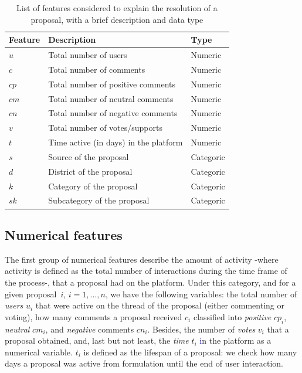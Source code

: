\begin{table}[H]
\caption{List of features considered to explain the resolution of a proposal, with a brief description and data type}
\label{list}
\centering
\begin{tabular}{lll}  
\\
\toprule
 \textbf{Feature} & \textbf{Description} & \textbf{Type}   \\
\midrule
$u$  	& Total number of users  & Numeric \\
$c$  	& Total number of comments &	Numeric	\\
$cp$ 	& Total number of positive comments & Numeric \\
$cm$ 	& Total number of neutral comments & Numeric \\
$cn$ 	& Total number of negative comments & Numeric \\
$v$  	& Total number of votes/supports & Numeric \\
$t$  	& Time active (in days) in the platform & Numeric \\
\midrule
$s$ 	& Source of the proposal & Categoric \\
$d$ 	& District of the proposal & Categoric \\
$k$	& Category of the proposal & Categoric \\
$sk$	& Subcategory of the proposal & Categoric \\
\bottomrule
\end{tabular}
\end{table}
\subsection{Numerical features}\label{sec:numfeat}
The first group of numerical features describe the amount of activity -where activity is defined as the total number of interactions during the time frame of the process-, that a proposal had on the platform. Under this category, and for a given proposal~$i$, $i=1,\hdots,n$, we have the following variables: the total number of \emph{users} $u_i$ that were active on the thread of the proposal (either commenting or voting), how many comments a proposal received $c_i$ classified into \emph{positive} $cp_i$, \emph{neutral} $cm_i$, and \emph{negative} comments $cn_i$. Besides, the number of \emph{votes} $v_i$ that a proposal obtained, and, last but not least, the \emph{time} $t_i$ \textcolor{blue} in the platform as a numerical variable. $t_i$ is defined as the lifespan of a proposal: we check how many days a proposal was active from formulation until the end of user interaction. 


